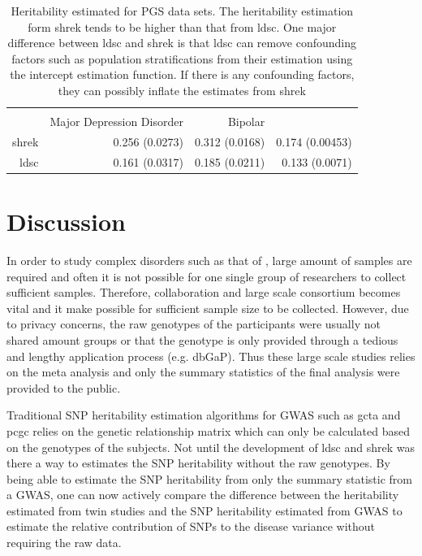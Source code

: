 		\begin{table}
			\centering
			\begin{tabular}{rrrr}
				\toprule
				 \\
				& Major Depression Disorder & Bipolar & \Glng{scz}\\
				\midrule
				\gls{shrek}   & 0.256 (0.0273)  & 0.312 (0.0168)  & 0.174 (0.00453) \\
				\gls{ldsc}   & 0.161 (0.0317) & 0.185 (0.0211) & 0.133 (0.0071)\\
				\bottomrule
			\end{tabular}
			\caption[Heritability Estimated for PGC Data Sets]{
				Heritability estimated for \gls{PGS} data sets.
				The heritability estimation form \gls{shrek} tends to be higher than that from \gls{ldsc}.
				One major difference between \gls{ldsc} and \gls{shrek} is that \gls{ldsc} can remove confounding factors such as population stratifications from their estimation using the intercept estimation function. 
				If there is any confounding factors, they can possibly inflate the estimates from \gls{shrek}
			}
			\label{tab:realData}
		\end{table}
		
	\section{Discussion}
	In order to study complex disorders such as that of , large amount of samples are required and often it is not possible for one single group of researchers to collect sufficient samples.
	Therefore, collaboration and large scale consortium becomes vital and it make possible for sufficient sample size to be collected.
	However, due to privacy concerns, the raw genotypes of the participants were usually not shared amount groups or that the genotype is only provided through a tedious and lengthy application process (e.g. dbGaP).
	Thus these large scale studies relies on the meta analysis and only the summary statistics of the final analysis were provided to the public.
	
	Traditional \gls{SNP} heritability estimation algorithms for \gls{GWAS} such as \gls{gcta} and \gls{pcgc} relies on the genetic relationship matrix which can only be calculated based on the genotypes of the subjects.
	Not until the development of \gls{ldsc} and \gls{shrek} was there a way to estimates the \gls{SNP} heritability without the raw genotypes.
	By being able to estimate the \gls{SNP} heritability from only the summary statistic from a \gls{GWAS}, one can now actively compare the difference between the heritability estimated from twin studies and the \gls{SNP} heritability estimated from \gls{GWAS} to estimate the relative contribution of \glspl{SNP} to the disease variance without requiring the raw data.
	
